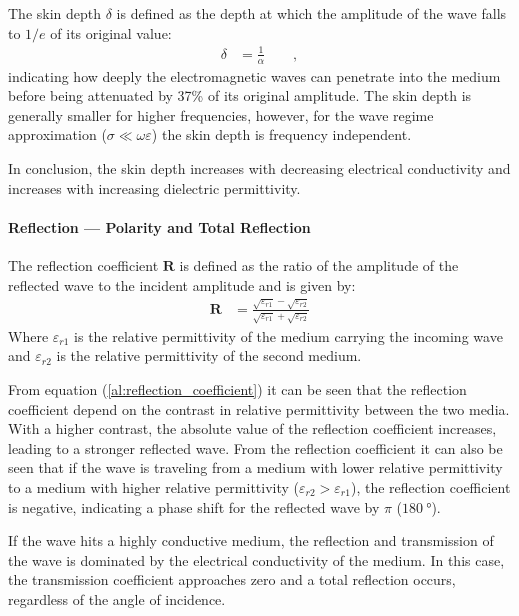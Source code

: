 The skin depth \(\delta\) is defined as the depth at which the amplitude of the wave falls to \(1/e\) of its original value:
\begin{align}
    \delta &= \frac{1}{\alpha} \qquad ,\label{al:skin_depth}
\end{align}
indicating how deeply the electromagnetic waves can penetrate into the medium before being attenuated by 37\% of its original amplitude.
The skin depth is generally smaller for higher frequencies, however, for the wave regime approximation (\(\sigma \ll \omega \varepsilon\)) the skin depth is frequency independent.

In conclusion, the skin depth increases with decreasing electrical conductivity and increases with increasing dielectric permittivity.

\paragraph{Reflection --- Polarity and Total Reflection}
The reflection coefficient \(\mathbf{R}\) is defined as the ratio of the amplitude of the reflected wave to the incident amplitude and is given by:
\begin{align}
    \mathbf{R} &= \frac{\sqrt{\varepsilon_{r1}} - \sqrt{\varepsilon_{r2}}}{\sqrt{\varepsilon_{r1}} + \sqrt{\varepsilon_{r2}}}\label{al:reflection_coefficient}
\end{align}
Where \(\varepsilon_{r1}\) is the relative permittivity of the medium carrying the incoming wave and \(\varepsilon_{r2}\) is the relative permittivity of the second medium.

From equation (\ref{al:reflection_coefficient}) it can be seen that the reflection coefficient depend on the contrast in relative permittivity between the two media. 
With a higher contrast, the absolute value of the reflection coefficient increases, leading to a stronger reflected wave.
From the reflection coefficient it can also be seen that if the wave is traveling from a medium with lower relative permittivity to a medium with higher relative permittivity (\(\varepsilon_{r2} > \varepsilon_{r1}\)), the reflection coefficient is negative, indicating a phase shift for the reflected wave by \(\pi\) (\(\SI{180}{\degree}\)).

If the wave hits a highly conductive medium, the reflection and transmission of the wave is dominated by the electrical conductivity of the medium. 
In this case, the transmission coefficient approaches zero and a total reflection occurs, regardless of the angle of incidence.

